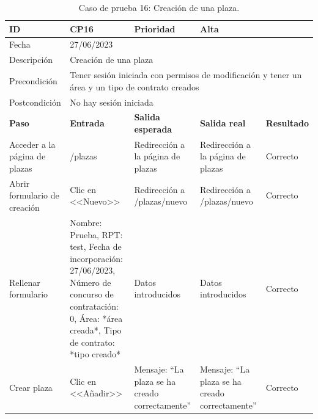 \begin{table}[H]
\begin{tabular}{p{} p{} p{} p{} p{}}
\cellcolor{gray!25}
ID   & CP16 & \cellcolor{gray!25} Prioridad   & Alta \\ \hline
\cellcolor{gray!25} Fecha	&	\multicolumn{4}{l}{27/06/2023} \\ \hline
\cellcolor{gray!25} Descripción		&	\multicolumn{4}{l}{Creación de una plaza} \\ \hline                                            
\cellcolor{gray!25}
Precondición  & \multicolumn{4}{p{.66\textwidth}}{Tener sesión iniciada con permisos de modificación y tener un área y un tipo de contrato creados} \\ \hline
\cellcolor{gray!25} Postcondición & \multicolumn{4}{l}{No hay sesión iniciada}                                                    \\ \hline
\rowcolor{gray!25}
\textbf{Paso}   & \textbf{Entrada} & \textbf{Salida esperada} & \textbf{Salida real} & \textbf{Resultado} \\ \hline
Acceder a la página de plazas 
& /plazas                                                                          
& Redirección a la página de plazas                                   
& Redirección a la página de plazas                                   
& Correcto                            
\\ \hline
Abrir formulario de creación
& Clic en <<Nuevo>>
& Redirección a /plazas/nuevo
& Redirección a /plazas/nuevo
& Correcto
\\ \hline
Rellenar formulario
& Nombre: Prueba, RPT: test, Fecha de incorporación: 27/06/2023, Número de concurso de contratación: 0, Área: *área creada*, Tipo de contrato: *tipo creado*
& Datos introducidos                     
& Datos introducidos 
& Correcto                            
\\ \hline  
Crear plaza
& Clic en <<Añadir>>
& Mensaje: ``La plaza se ha creado correctamente''                     
& Mensaje: ``La plaza se ha creado correctamente''  
& Correcto                            
\\ \hline              
\end{tabular}
\caption{Caso de prueba 16: Creación de una plaza.}
\end{table}

